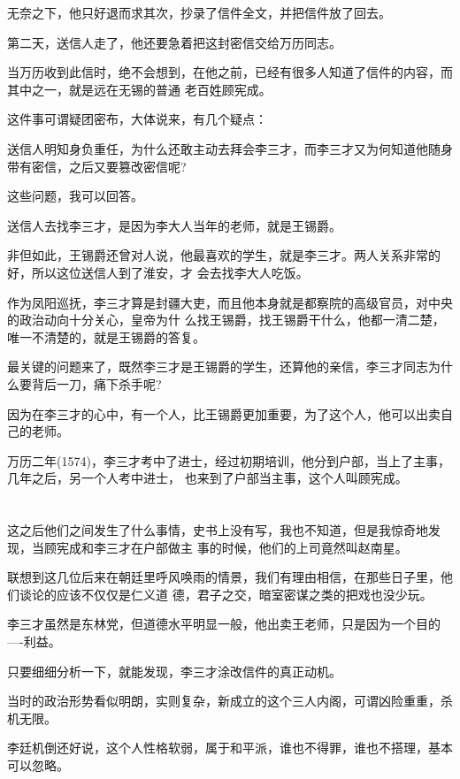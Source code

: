 \documentclass[11pt,a4paper,onecolumn]{article}
\begin{document}
无奈之下，他只好退而求其次，抄录了信件全文，并把信件放了回去。

第二天，送信人走了，他还要急着把这封密信交给万历同志。

当万历收到此信时，绝不会想到，在他之前，已经有很多人知道了信件的内容，而其中之一，就是远在无锡的普通
老百姓顾宪成。

这件事可谓疑团密布，大体说来，有几个疑点：

送信人明知身负重任，为什么还敢主动去拜会李三才，而李三才又为何知道他随身带有密信，之后又要篡改密信呢?

这些问题，我可以回答。

送信人去找李三才，是因为李大人当年的老师，就是王锡爵。

非但如此，王锡爵还曾对人说，他最喜欢的学生，就是李三才。两人关系非常的好，所以这位送信人到了淮安，才
会去找李大人吃饭。

作为凤阳巡抚，李三才算是封疆大吏，而且他本身就是都察院的高级官员，对中央的政治动向十分关心，皇帝为什
么找王锡爵，找王锡爵干什么，他都一清二楚，唯一不清楚的，就是王锡爵的答复。

最关键的问题来了，既然李三才是王锡爵的学生，还算他的亲信，李三才同志为什么要背后一刀，痛下杀手呢?

因为在李三才的心中，有一个人，比王锡爵更加重要，为了这个人，他可以出卖自己的老师。

万历二年(1574)，李三才考中了进士，经过初期培训，他分到户部，当上了主事，几年之后，另一个人考中进士，
也来到了户部当主事，这个人叫顾宪成。

\section[\thesection]{}

这之后他们之间发生了什么事情，史书上没有写，我也不知道，但是我惊奇地发现，当顾宪成和李三才在户部做主
事的时候，他们的上司竟然叫赵南星。

联想到这几位后来在朝廷里呼风唤雨的情景，我们有理由相信，在那些日子里，他们谈论的应该不仅仅是仁义道
德，君子之交，暗室密谋之类的把戏也没少玩。

李三才虽然是东林党，但道德水平明显一般，他出卖王老师，只是因为一个目的----利益。

只要细细分析一下，就能发现，李三才涂改信件的真正动机。

当时的政治形势看似明朗，实则复杂，新成立的这个三人内阁，可谓凶险重重，杀机无限。

李廷机倒还好说，这个人性格软弱，属于和平派，谁也不得罪，谁也不搭理，基本可以忽略。
\end{document}
